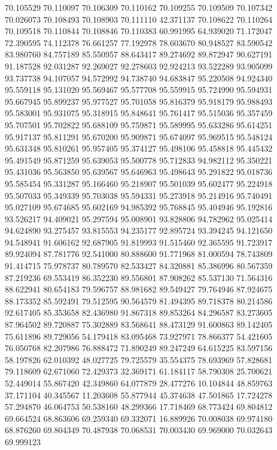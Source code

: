 70.105529
70.110097
70.106309
70.110162
70.109255
70.109509
70.107342
70.026073
70.108493
70.108903
70.111110
42.371137
70.108622
70.110264
70.109518
70.110844
70.108846
70.110383
60.991995
64.939020
71.172047
72.390595
74.112378
76.661257
77.192978
78.603670
80.948527
83.590542
83.980760
84.757189
85.550957
88.643417
89.274692
89.872947
90.627191
91.187528
92.031287
92.269027
92.278603
92.924213
93.522289
93.905099
93.737738
94.107057
94.572992
94.738740
94.683847
95.220508
94.924340
95.559118
95.131020
95.569467
95.577708
95.559915
95.724990
95.594931
95.667945
95.899237
95.977527
95.701058
95.816379
95.918179
95.988493
95.583001
95.931075
95.318915
95.848641
95.761417
95.515036
95.357459
95.707501
95.702822
95.688109
95.759871
95.589995
95.633286
95.614251
95.917137
95.811291
95.670200
95.909871
95.674097
95.969515
95.548124
95.631348
95.810261
95.957405
95.374127
95.498106
95.458818
95.445432
95.491549
95.871259
95.639053
95.500778
95.712833
94.982112
95.350221
95.431036
95.563850
95.639567
95.646963
95.498643
95.291822
95.018736
95.585454
95.331287
95.166460
95.218907
95.501039
95.602477
95.224918
95.507033
95.349339
95.703038
95.594331
95.273918
95.214916
95.740491
95.027109
95.674685
95.602169
94.985392
95.768845
95.404946
95.192816
93.526217
94.409021
95.297594
95.008901
93.828806
94.782962
95.025414
94.624890
93.275457
93.815553
94.235177
92.895724
93.394245
94.121650
94.548941
91.606162
92.687905
91.819993
91.515460
92.365595
91.723917
89.924094
87.781776
92.541000
80.888600
91.771968
81.000594
78.743809
91.414715
75.978737
80.789570
82.533427
84.320881
85.386996
80.567359
87.219236
69.553419
86.352230
89.556801
87.908262
85.537130
71.564316
88.622941
80.654183
79.596757
88.981682
89.549427
79.764946
87.924675
88.173352
85.592491
79.512595
90.564579
81.494395
89.718378
80.214586
92.617405
85.353658
82.436980
91.867318
89.853264
84.296587
83.273605
87.964502
89.720887
75.302889
83.568641
88.473129
91.600863
89.142405
75.611896
89.729056
54.179418
83.095468
73.927971
78.866377
54.421605
76.050768
82.207986
76.888472
71.890249
89.247249
64.615225
83.597156
58.197826
62.010392
48.027725
79.725579
35.554375
78.693969
57.828681
79.118609
62.671060
72.429373
32.369171
61.184117
58.790308
25.700621
52.449014
55.867420
42.349860
64.077879
28.477276
10.104844
48.859763
37.171104
40.345567
11.203608
55.877944
45.374638
47.501865
17.724278
57.294870
46.064753
50.538160
48.299366
17.718469
68.773424
69.804812
69.664524
68.863606
69.259340
69.332071
16.889926
70.008038
69.974180
68.876260
69.804349
70.487938
70.068531
70.003430
69.969000
70.032643
69.999123
